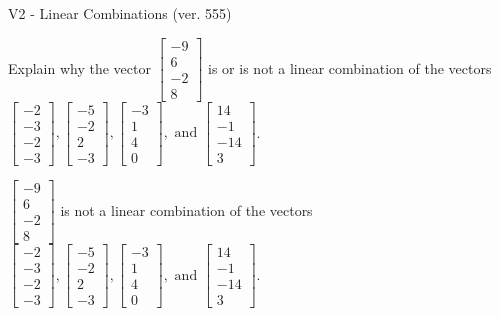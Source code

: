 \begin{exercise}
  \begin{exerciseTitle}V2 - Linear Combinations (ver. 555)\end{exerciseTitle}
  \begin{exerciseStatement}
    Explain why the vector \(\left[\begin{array}{c}
-9 \\
6 \\
-2 \\
8
\end{array}\right]\)  is or is not a linear 
	combination of the vectors \(\left[\begin{array}{c}
-2 \\
-3 \\
-2 \\
-3
\end{array}\right] , \left[\begin{array}{c}
-5 \\
-2 \\
2 \\
-3
\end{array}\right] , \left[\begin{array}{c}
-3 \\
1 \\
4 \\
0
\end{array}\right] , \text{ and } \left[\begin{array}{c}
14 \\
-1 \\
-14 \\
3
\end{array}\right]\).
	


  \end{exerciseStatement}
  \begin{exerciseAnswer}
   \(\left[\begin{array}{c}
-9 \\
6 \\
-2 \\
8
\end{array}\right]\) 
  	 is not  
	a linear combination of the vectors \(\left[\begin{array}{c}
-2 \\
-3 \\
-2 \\
-3
\end{array}\right] , \left[\begin{array}{c}
-5 \\
-2 \\
2 \\
-3
\end{array}\right] , \left[\begin{array}{c}
-3 \\
1 \\
4 \\
0
\end{array}\right] , \text{ and } \left[\begin{array}{c}
14 \\
-1 \\
-14 \\
3
\end{array}\right]\).


\end{exerciseAnswer}
\end{exercise}
